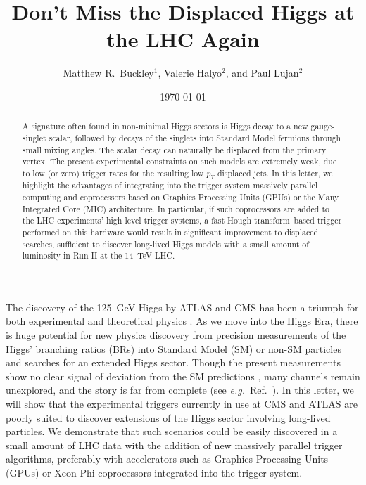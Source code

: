 \documentclass[aps,prl,twocolumn,preprintnumbers,groupedaddress,nofootinbib]{revtex4}
\begin{document}


\title{Don't Miss the Displaced Higgs at the LHC Again}

\author{Matthew R.~Buckley$^{1}$, Valerie Halyo$^2$, and Paul Lujan$^2$}

\preprint{}
\date{\today}

\begin{abstract}
A signature often found in non-minimal Higgs sectors is Higgs decay to a new gauge-singlet scalar, followed by decays of the singlets into Standard Model  fermions through small mixing angles. The scalar decay can naturally be displaced from the primary vertex. The present experimental constraints on such models are extremely weak, due to low (or zero) trigger rates for the resulting low $p_T$ displaced jets. In this letter, we highlight the advantages of integrating into the trigger system massively parallel computing and coprocessors based on Graphics Processing Units (GPUs) or the Many Integrated Core (MIC) architecture. In particular, if such coprocessors are added to the LHC experiments' high level trigger systems, a fast Hough transform--based trigger performed on this hardware would result in significant improvement to displaced searches, sufficient to discover long-lived Higgs models with a small amount of luminosity in Run II at the 14~TeV LHC.
\end{abstract}
\maketitle

The discovery of the 125~GeV Higgs by ATLAS and CMS \cite{Aad:2012tfa,Chatrchyan:2012ufa} has been a triumph for both experimental and theoretical physics \cite{Englert:1964et}. As we move into the Higgs Era, there is huge potential for new physics discovery from precision measurements of the Higgs' branching ratios (BRs) into Standard Model (SM) or non-SM particles and searches for an extended Higgs sector. Though the present measurements show no clear signal of deviation from the SM predictions \cite{Aad:2013wqa}, many channels remain unexplored, and the story is far from complete (see {\it e.g.}~Ref.~\cite{Curtin:2013fra}). In this letter, we will show that the experimental triggers currently in use at CMS and ATLAS are poorly suited to discover extensions of the Higgs sector involving long-lived particles. We demonstrate that such scenarios could be easily discovered in a small amount of LHC data with the addition of new massively parallel trigger algorithms, preferably with accelerators such as Graphics Processing Units (GPUs) or Xeon Phi coprocessors integrated into the trigger system.
\end{document}
